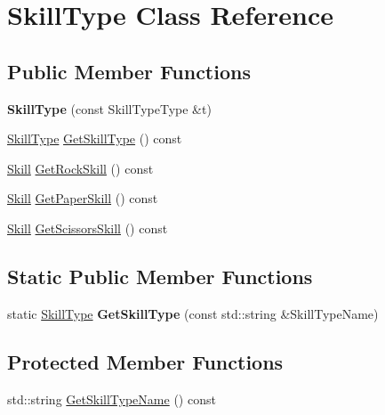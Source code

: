 \hypertarget{class_skill_type}{}\section{Skill\+Type Class Reference}
\label{class_skill_type}
\subsection*{Public Member Functions}
\begin{DoxyCompactItemize}
\item 
\hypertarget{class_skill_type_a6c8a2607e7bc0137871504d681625e2b}{}{\bfseries Skill\+Type} (const Skill\+Type\+Type \&t)\label{class_skill_type_a6c8a2607e7bc0137871504d681625e2b}

\item 
\hyperlink{class_skill_type}{Skill\+Type} \hyperlink{class_skill_type_abdbb933e04dcfefbb9456c5860a6ae0a}{Get\+Skill\+Type} () const 
\item 
\hyperlink{struct_skill}{Skill} \hyperlink{class_skill_type_a34c5fa040a4bc9faa54c20f8c05969a4}{Get\+Rock\+Skill} () const 
\item 
\hyperlink{struct_skill}{Skill} \hyperlink{class_skill_type_a324e79968a5a197417aab55866ef0629}{Get\+Paper\+Skill} () const 
\item 
\hyperlink{struct_skill}{Skill} \hyperlink{class_skill_type_ae07cda8ecb9720092c435ff4eb12be3b}{Get\+Scissors\+Skill} () const 
\end{DoxyCompactItemize}
\subsection*{Static Public Member Functions}
\begin{DoxyCompactItemize}
\item 
\hypertarget{class_skill_type_ad09b4c9baf9e032726212550e00701c6}{}static \hyperlink{class_skill_type}{Skill\+Type} {\bfseries Get\+Skill\+Type} (const std\+::string \&Skill\+Type\+Name)\label{class_skill_type_ad09b4c9baf9e032726212550e00701c6}

\end{DoxyCompactItemize}
\subsection*{Protected Member Functions}
\begin{DoxyCompactItemize}
\item 
std\+::string \hyperlink{class_skill_type_a4b5a58d034a63b9b75279e22d9726947}{Get\+Skill\+Type\+Name} () const 
\end{DoxyCompactItemize}


